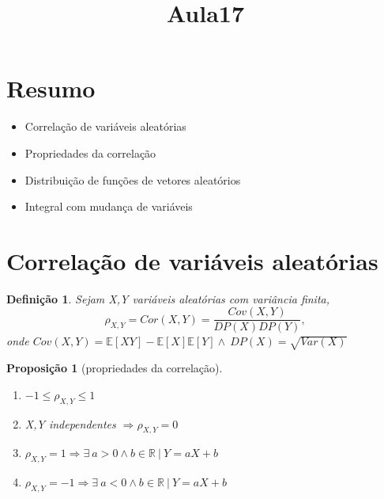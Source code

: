 \documentclass[12pt, letterpaper]{article}
\title{Aula17}
\date{}
\newtheorem{proposition}{Proposição}
\newtheorem{definition}{Definição}
\begin{document}
\maketitle
\section*{Resumo}
    \begin{itemize}
      \item Correlação de variáveis aleatórias
      \item Propriedades da correlação
      \item Distribuição de funções de vetores aleatórios
      \item Integral com mudança de variáveis
    \end{itemize}
\section{Correlação de variáveis aleatórias}
\begin{definition}
  Sejam X,Y variáveis aleatórias com variância finita, \[\rho_{X,Y} = Cor(X,Y) = \frac{Cov(X,Y)}{DP(X)DP(Y)},\]
  onde \(Cov(X,Y) = \mathbb{E}[XY]-\mathbb{E}[X]\mathbb{E}[Y] \wedge\ DP(X) = \sqrt{Var(X)} \)
\end{definition}

\begin{proposition}[propriedades da correlação]
  \begin{enumerate}
    \item  \(-1\leq \rho_{X,Y}\leq 1 \)
    \item X,Y independentes \(\Rightarrow \rho_{X,Y} = 0\)
    \item \(\rho_{X,Y} = 1 \Rightarrow \exists\ a > 0 \wedge b \in \mathbb{R}\ |\ Y = aX + b\)
    \item \(\rho_{X,Y} = -1 \Rightarrow \exists\ a < 0 \wedge b \in \mathbb{R}\ |\ Y = aX + b\)
    \end{enumerate}

\end{proposition}
\end{document}
